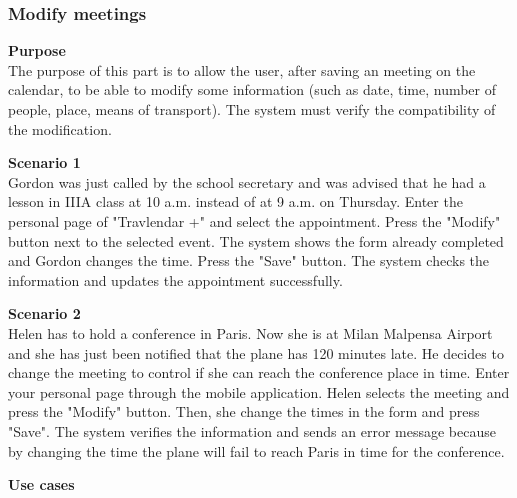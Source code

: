 \documentclass{article}
\begin{document}
	\subsubsection{Modify meetings}
	
	\bigskip
	\noindent
	\textbf{Purpose} \\
	The purpose of this part is to allow the user, after saving an meeting on the calendar, to be able to modify some information (such as date, time, number of people, place, means of transport). The system must verify the compatibility of the modification.
	
	\bigskip
	\noindent
	\textbf{Scenario 1} \\
	Gordon was just called by the school secretary and was advised that he had a lesson in IIIA class at 10 a.m. instead of at 9 a.m. on Thursday. Enter the personal page of "Travlendar +" and select the appointment. Press the "Modify" button next to the selected event. The system shows the form already completed and Gordon changes the time. Press the "Save" button. The system checks the information and updates the appointment successfully.
	
	\bigskip
	\noindent
	\textbf{Scenario 2} \\
	Helen has to hold a conference in Paris. Now she is at Milan Malpensa Airport and she has just been notified that the plane has 120 minutes late. He decides to change the meeting to control if she can reach the conference place in time. Enter your personal page through the mobile application. Helen selects the meeting and press the "Modify" button. Then, she change the times in the form and press "Save". The system verifies the information and sends an error message because by changing the time the plane will fail to reach Paris in time for the conference.
	
	\bigskip
	\noindent
	\textbf{Use cases} \\
	
\end{document}
